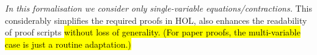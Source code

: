
\emph{In this
formalisation we consider only single-variable equations/contractions.}
This considerably
 simplifies the required proofs in HOL, also enhances the readability of
 proof scripts \hl{without loss of generality. (For paper proofs, the
 multi-variable case is just a routine adaptation.)}





